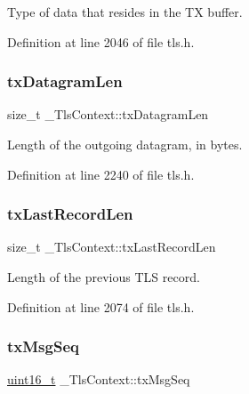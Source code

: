 Type of data that resides in the TX buffer. 



Definition at line 2046 of file tls.\+h.

\mbox{\label{struct__TlsContext_adf49e3b273f63ff9168dfe9573b13a0d}} 
\subsubsection{\texorpdfstring{tx\+Datagram\+Len}{txDatagramLen}}
{\footnotesize\ttfamily size\+\_\+t \+\_\+\+Tls\+Context\+::tx\+Datagram\+Len}



Length of the outgoing datagram, in bytes. 



Definition at line 2240 of file tls.\+h.

\mbox{\label{struct__TlsContext_ab117e95d9f1251cfc14f9ca4324a054d}} 
\subsubsection{\texorpdfstring{tx\+Last\+Record\+Len}{txLastRecordLen}}
{\footnotesize\ttfamily size\+\_\+t \+\_\+\+Tls\+Context\+::tx\+Last\+Record\+Len}



Length of the previous T\+LS record. 



Definition at line 2074 of file tls.\+h.

\mbox{\label{struct__TlsContext_ab246bb284734fbbd8f706d02a718ba55}} 
\subsubsection{\texorpdfstring{tx\+Msg\+Seq}{txMsgSeq}}
{\footnotesize\ttfamily \hyperlink{stdint_8h_a273cf69d639a59973b6019625df33e30}{uint16\+\_\+t} \+\_\+\+Tls\+Context\+::tx\+Msg\+Seq}



